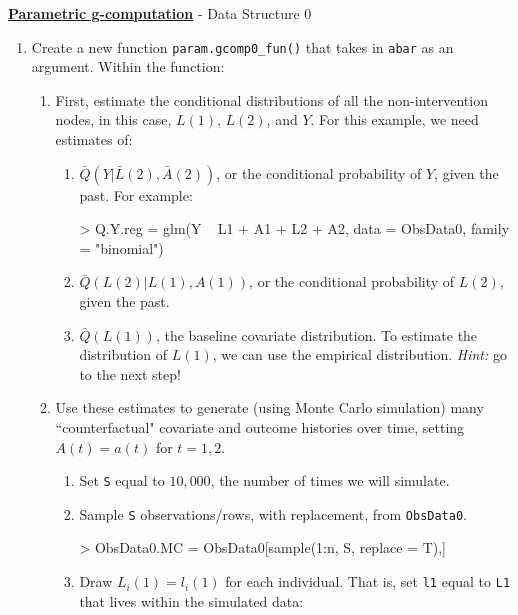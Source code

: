 \documentclass[answers]{exam}
\begin{document}
\noindent \textbf{\underline{Parametric g-computation}} - Data Structure 0
\begin{enumerate}
\item Create a new function \texttt{param.gcomp0\_fun()} that takes in \texttt{abar} as an argument. Within the function:
\begin{enumerate}
\item First, estimate the conditional distributions of all the non-intervention nodes, in this case, $L(1)$, $L(2)$, and $Y$. For this example, we need estimates of:
\begin{enumerate}
\item $\bar{Q}(Y|\bar{L}(2), \bar{A}(2))$, or the conditional probability of $Y$, given the past. For example:
\begin{Schunk}
\begin{Sinput}
> Q.Y.reg = glm(Y ~ L1 + A1 + L2 + A2, data = ObsData0, family = "binomial")
\end{Sinput}
\end{Schunk}
\item $\bar{Q}(L(2)|L(1), A(1))$, or the conditional probability of $L(2)$, given the past.
\item $\bar{Q}(L(1))$, the baseline covariate distribution. To estimate the distribution of $L(1)$, we can use the empirical distribution. \emph{Hint:} go to the next step!
\end{enumerate}
\item Use these estimates to generate (using Monte Carlo simulation) many ``counterfactual" covariate and outcome histories over time, setting $A(t) = a(t)$ for $t = 1,2$.  
\begin{enumerate}
\item Set \texttt{S} equal to $10,000$, the number of times we will simulate.
\item Sample \texttt{S} observations/rows, with replacement, from \texttt{ObsData0}.
\begin{Schunk}
\begin{Sinput}
> ObsData0.MC = ObsData0[sample(1:n, S, replace = T),]
\end{Sinput}
\end{Schunk}
\item Draw $L_i(1) = l_i(1)$ for each individual. That is, set \texttt{l1} equal to \texttt{L1} that lives within the simulated data:
\begin{Schunk}

\end{Schunk}
\end{enumerate}
\end{enumerate}
\end{enumerate}
\end{document}
